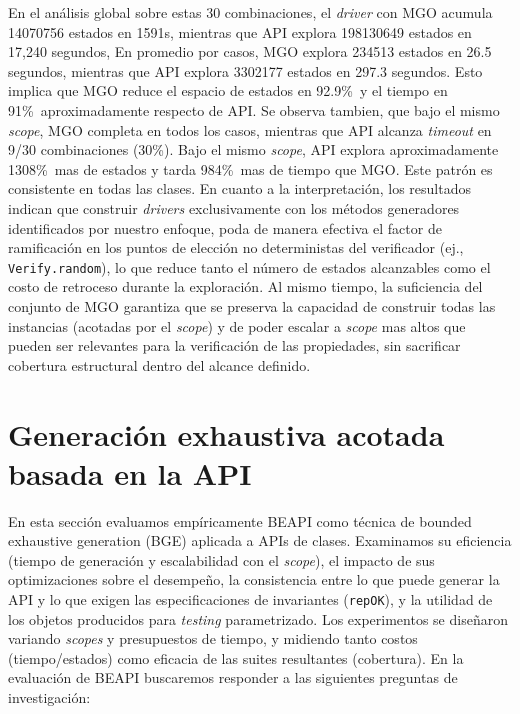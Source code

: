 En el análisis global sobre estas 30 combinaciones, el \emph{driver} con
\textsf{MGO} acumula 14070756 estados en 1591s, mientras que \textsf{API} explora 198130649 estados en 17,240 segundos,
En promedio por casos, \textsf{MGO} explora 234513 estados en 26.5 segundos, mientras que \textsf{API} 
explora 3302177 estados en 297.3 segundos. Esto implica que \textsf{MGO} reduce el espacio de estados en 
92.9\%\ y el tiempo en 91\%\ aproximadamente respecto de \textsf{API}. 
Se observa tambien, que bajo el mismo \emph{scope}, \textsf{MGO} completa en todos los casos, mientras que \textsf{API} alcanza \emph{timeout} en 9/30 combinaciones (30\%).
Bajo el mismo \emph{scope}, \textsf{API} explora aproximadamente 1308\%\ mas de estados y tarda 984\%\ mas de tiempo que \textsf{MGO}.
Este patrón es consistente en todas las clases.
En cuanto a la interpretación, los resultados indican que construir \emph{drivers}
exclusivamente con los métodos generadores identificados por nuestro enfoque,
poda de manera efectiva el factor de ramificación en los puntos de elección
no deterministas del verificador (ej., \texttt{Verify.random}), lo que reduce
tanto el número de estados alcanzables como el costo de retroceso durante la
exploración. Al mismo tiempo, la suficiencia del conjunto de \textsf{MGO}
garantiza que se preserva la capacidad de construir todas las instancias
(acotadas por el \emph{scope}) y de poder escalar a \emph{scope} mas altos que pueden ser 
relevantes para la verificación de las propiedades,
sin sacrificar cobertura estructural dentro del alcance definido.




\section{Generación exhaustiva acotada basada en la API}
\label{sec:experimentalBeapi}

En esta sección evaluamos empíricamente BEAPI como técnica de bounded exhaustive generation (BGE) aplicada a APIs de clases. 
Examinamos su eficiencia (tiempo de generación y escalabilidad con el \emph{scope}), 
el impacto de sus optimizaciones sobre el desempeño, 
la consistencia entre lo que puede generar la API y lo que exigen las especificaciones de invariantes (\texttt{repOK}), 
y la utilidad de los objetos producidos para \emph{testing} parametrizado. 
Los experimentos se diseñaron variando \emph{scopes} y presupuestos de tiempo, 
y midiendo tanto costos (tiempo/estados) como eficacia de las suites resultantes (cobertura). 
En la evaluación de BEAPI buscaremos responder a las siguientes preguntas de
investigación:

